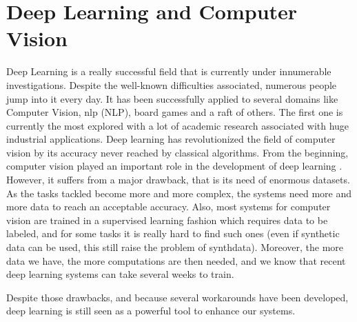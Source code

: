 \documentclass[12pt, a4paper]{report}
\begin{document}
		\section{Deep Learning and Computer Vision}
			Deep Learning is a really successful field that is currently under innumerable investigations.
			Despite the well-known difficulties associated, numerous people jump into it every day.
			It has been successfully applied to several domains like Computer Vision, \gls{nlp} (NLP), board games and a raft of others.
			The first one is currently the most explored with a lot of academic research associated with huge industrial applications.
			Deep learning has revolutionized the field of computer vision by its accuracy never reached by classical algorithms.
			From the beginning, computer vision played an important role in the development of deep learning \cite{lecun_89,lecun_98,neocognitron}.
			However, it suffers from a major drawback, that is its need of enormous datasets.
			As the tasks tackled become more and more complex, the systems need more and more data to reach an acceptable accuracy.
			Also, most systems for computer vision are trained in a supervised learning fashion which requires data to be labeled, and for some tasks it is really hard to find such ones (even if synthetic data can be used, this still raise the problem of \gls{synthdata}).
			Moreover, the more data we have, the more computations are then needed, and we know that recent deep learning systems can take several weeks to train.\par
			Despite those drawbacks, and because several workarounds have been developed, deep learning is still seen as a powerful tool to enhance our systems.
			
\end{document}

